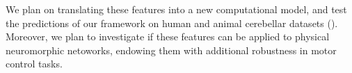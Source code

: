 \documentclass[a4paper, 10pt]{article}
\begin{document}
We plan on translating these features into a new computational model, and test
the predictions of our framework on human and animal cerebellar datasets
(\cite{Kumar2022PhysiologicalRO, 10.1242/dmm.049514}). Moreover, we plan to
investigate if these features can be applied to physical neuromorphic
netoworks, endowing them with additional robustness in motor control
tasks.



\printbibliography
\end{document}
